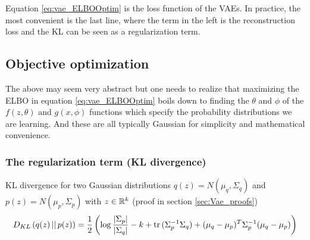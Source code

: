 Equation \eqref{eq:vae_ELBOOptim} is the loss function of the VAEs.
In practice, the most convenient is the last line, where the term in
the left is the reconstruction loss and the KL can be seen as a
regularization term.




\subsection{Objective optimization}\label{sec:Vae_optim}
The above may seem very abstract but one needs to realize that maximizing the ELBO in equation \eqref{eq:vae_ELBOOptim} boils down to
finding the $\theta$ and $\phi$ of the $f(z,\theta)$ and $g(x,\phi)$
functions which specify the probability distributions we are
learning. And these are all typically Gaussian for simplicity and
mathematical convenience.

\subsubsection{The regularization term (KL divergence)}\label{sec:Vae_klOptim}

KL divergence for two Gaussian distributions $q(z) = N(\mu_q, \Sigma_q)$ and $p(z) = N(\mu_p, \Sigma_p)$ with $z \in \mathbb{R}^k$ (proof in section \ref{sec:Vae_proofs})
\begin{equation}
  D_{KL}\left( q(z) \, || \, p(z)\right) 
  = \frac{1}{2} \left( \log \frac{|\Sigma_p|}{|\Sigma_q|} - k + \operatorname{tr} \, (\Sigma_p^{-1} \Sigma_q) + (\mu_q - \mu_p)^T \Sigma_p^{-1} (\mu_q - \mu_p) \right)
\end{equation}



